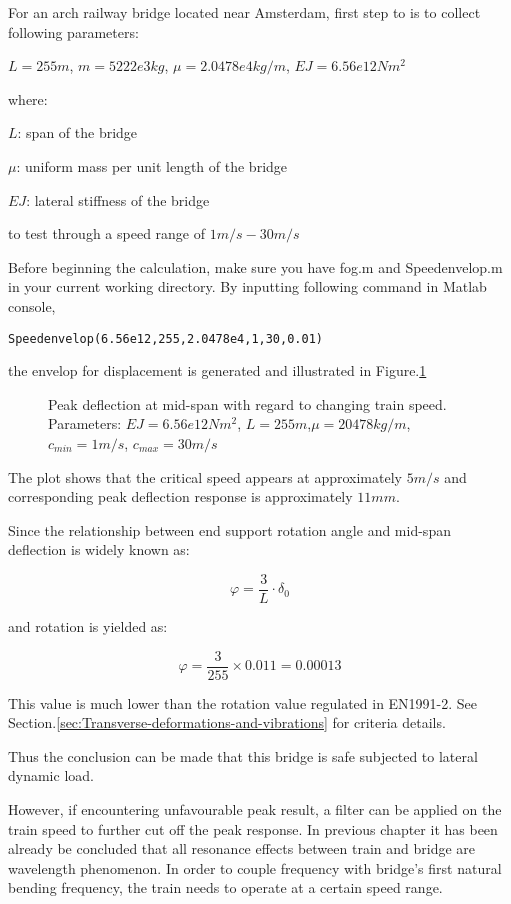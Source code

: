 For an arch railway bridge located near Amsterdam, first step to is to collect following parameters:

$L = 255m$, $m = 5222e3kg$, $\mu = 2.0478e4 kg/m$, $EJ = 6.56e12Nm^2$

where:

$L$: span of the bridge

$\mu$: uniform mass per unit length of the bridge

$EJ$: lateral stiffness of the bridge

to test through a speed range of $1m/s - 30m/s$

Before beginning the calculation, make sure you have fog.m and Speedenvelop.m in your current working directory. By inputting following command in Matlab console, 

\texttt{Speedenvelop(6.56e12,255,2.0478e4,1,30,0.01)}


the envelop for displacement is generated and illustrated in Figure.\ref{fig:spedefEJ6560000000000L255min1max30mu20478.tikz}

\begin{figure}[h!]
\centering 
\newlength\figureheight 
\newlength\figurewidth 
\setlength\figureheight{6cm} 
\setlength\figurewidth{6cm} 
 
\caption{Peak deflection at mid-span with regard to changing train speed. Parameters: $EJ = 6.56e12Nm^2$, $L= 255m$,$\mu = 20478 kg/m$, $c_{min}=1m/s$, $c_{max} = 30m/s$} 
\label{fig:spedefEJ6560000000000L255min1max30mu20478.tikz} 
\end{figure}

The plot shows that the critical speed appears at approximately $5m/s$ and corresponding peak deflection response is approximately $11mm$. 

Since the relationship between end support rotation angle and mid-span deflection is widely known as:

$$ \varphi = \frac{3}{L}\cdot \delta_0  $$

and rotation is yielded as:

$$ \varphi = \frac{3}{255}\times 0.011 = 0.00013 $$

This value is much lower than the rotation value regulated in EN1991-2. See Section.\ref{sec:Transverse-deformations-and-vibrations} for criteria details.

Thus the conclusion can be made that this bridge is safe subjected to lateral dynamic load.

However, if encountering unfavourable peak result, a filter can be applied on the train speed to further cut off the peak response. In previous chapter it has been already be concluded that all resonance effects between train and bridge are wavelength phenomenon. In order to couple frequency with bridge's first natural bending frequency, the train needs to operate at a certain speed range. 

